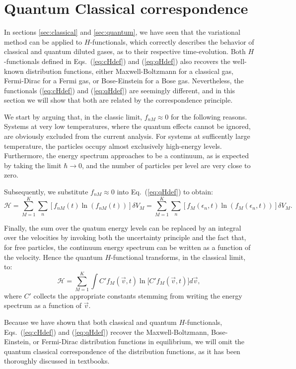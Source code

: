 

\section{Quantum Classical correspondence}\label{sec:qccorrespondence}

In sections \ref{sec:classical} and \ref{sec:quantum}, we have seen that the variational
method can be applied to $H$-functionals, which correctly describes the behavior of
classical and quantum diluted gases, as to their respective time-evolution.
Both $H$-functionals defined in Eqs.~(\ref{eq:cHdef}) and
(\ref{eq:qHdef}) also recovers the well-known distribution functions, either Maxwell-Boltzmann
for a classical gas, Fermi-Dirac for a Fermi gas, or Bose-Einstein for a Bose gas. Nevertheless,
the functionals (\ref{eq:cHdef}) and
(\ref{eq:qHdef}) are seemingly different, and in this section we will show that both are
related by the correspondence principle.

We start by arguing that, in the classic limit, $f_{nM}\approx0$ for the following reasons.
Systems at very low temperatures, where the quantum effects cannot be ignored, are obviously excluded
from the current analysis. For systems at sufficently large temperature, the particles
occupy almost exclusively high-energy levels. 
Furthermore, the energy spectrum approaches to be a continuum, as is expected by taking the limit
$\hbar\to0$, and the number of particles per level are very close to zero.

Subsequently, we substitute $f_{nM}\approx0$ into Eq.~(\ref{eq:qHdef}) to obtain:
%
\begin{equation}\label{h-quantic2}
    \mathcal{H}= \sum_{M=1}^{K} \sum_n
    \left[ f_{nM}(t)\ln \left(f_{nM}(t)\right)\right] \delta V_M
    =\sum_{M=1}^{K} \sum_n
    \left[ f_{M}(\epsilon_n,t) \ln \left( f_{M}(\epsilon_n,t)\right)\right] \delta V_M.
\end{equation}
%

Finally, the sum over the quatum energy levels can be replaced by an integral over the velocities
by invoking both the uncertainty principle and the fact that, for free particles, the continuum
energy spectrum
can be written as a function of the velocity. Hence the quantum $H$-functional
transforms, in the classical limit, to:
%
\begin{equation}\label{eq:qHclassLim}
    \mathcal{H}= \sum_{M=1}^{K}\int C'f_M(\vec v,t)\ln\big[C' f_M(\vec v,t)\big] d\vec v,
\end{equation}
%
where $C'$ collects the appropriate constants stemming from writing the energy spectrum as
a function of $\vec v$.

Because we have shown that both classical and quantum $H$-functionals, Eqs.~(\ref{eq:cHdef}) and
(\ref{eq:qHdef}) recover the Maxwell-Boltzmann, Bose-Einstein, or Fermi-Dirac distribution
functions in equilibrium, we will omit the quantum classical correspondence of the distribution functions,
as it has been thoroughly discussed in textbooks.




